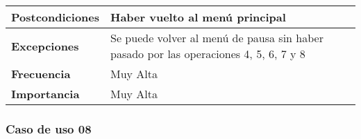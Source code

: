 \begin{tabularx}{\columnwidth}{l|l}
\begin{minipage}{0.25\columnwidth}
\textbf{Postcondiciones} 
\end{minipage}
&
\begin{minipage}{0.65\columnwidth}
Haber vuelto al menú principal
\end{minipage}
\\ \hline

\begin{minipage}{0.25\columnwidth}
\textbf{Excepciones} 
\end{minipage}
&
\begin{minipage}{0.65\columnwidth}
Se puede volver al menú de pausa sin haber pasado por las operaciones 4, 5, 6, 7 y 8
\end{minipage}
\\ \hline

\begin{minipage}{0.25\columnwidth}
\textbf{Frecuencia} 
\end{minipage}
&
\begin{minipage}{0.65\columnwidth}
Muy Alta
\end{minipage}
\\ \hline

\begin{minipage}{0.25\columnwidth}
\textbf{Importancia} 
\end{minipage}
&
\begin{minipage}{0.65\columnwidth}
Muy Alta
\end{minipage}
\\ \hline
\end{tabularx}

\subsubsection{Caso de uso 08}

